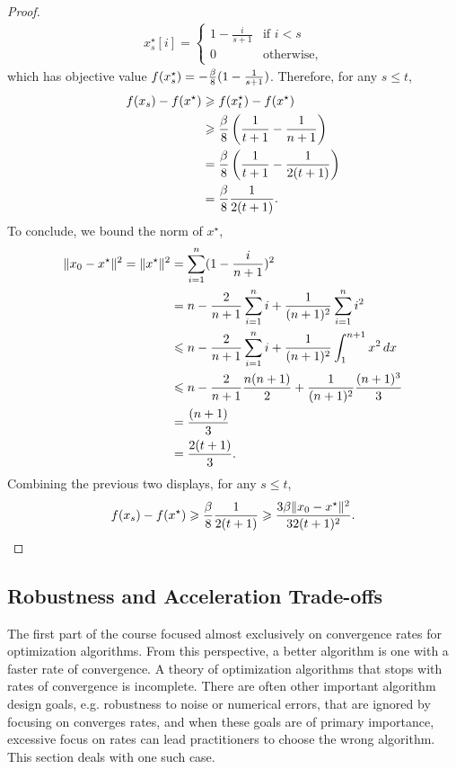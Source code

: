 \begin{proof}
\begin{align*}
    x_s^\star[i] = 
    \begin{cases}
        1- \frac{i}{s + 1} &\text{if } i < s \\
        0 &\text{otherwise},
    \end{cases}
\end{align*}
which has objective value $f(x_s^\star) = -\frac{\beta}{8}(1 - \frac{1}{s + 1} )$.
Therefore, for any $s \leq t$,
\begin{align*}
    f(x_s) - f(x^\star) 
    &\geqslant f(x_t^\star) - f(x^\star) \\
    &\geqslant \frac{\beta}{8} \left(\frac{1}{t+1} - \frac{1}{n+1} \right ) \\
    &= \frac{\beta}{8} \left(\frac{1}{t+1} - \frac{1}{2(t+1)} \right ) \\
    &= \frac{\beta}{8}\frac{1}{2(t+1)}.
\end{align*}
To conclude, we bound the norm of $x^\star$,
\begin{align*}
    \lVert x_0 - x^\star\rVert^2 =
    \lVert x^\star\rVert^2 
    &= \sum_{i=1}^n (1 - \frac{i}{n+1} )^2  \\
    &= n - \frac{2}{n+1} \sum_{i=1}^n i + \frac{1}{(n+1)^2} \sum_{i=1}^{n} i^2 \\
    &\leqslant n - \frac{2}{n+1} \sum_{i=1}^n i + \frac{1}{(n+1)^2} \int_1^{n+1} x^2 \, dx \\
    &\leqslant n - \frac{2}{n+1}\frac{n(n+1)}{2} + \frac{1}{(n+1)^2} \frac{(n+1)^3}{3} \\
    &= \frac{(n+1)}{3} \\
    &= \frac{2(t+1)}{3}.
\end{align*}
Combining the previous two displays, for any $s \leq t$,
\begin{align*}
    f(x_s) - f(x^\star)
    \geqslant \frac{\beta}{8}\frac{1}{2(t+1)} 
    \geqslant \frac{3 \beta\lVert x_0 - x^\star\rVert^2}{32(t+1)^2}.
\end{align*}
\end{proof}

\subsection{Robustness and Acceleration Trade-offs}
The first part of the course focused almost exclusively on
convergence rates for optimization algorithms. From this
perspective, a better algorithm is one with a faster rate of convergence.
A theory of optimization algorithms that stops with rates of
convergence is incomplete. There are often other important algorithm design
goals, e.g. robustness to noise or numerical errors, that are ignored by
focusing on converges rates, and when these goals are of primary importance, 
excessive focus on rates can lead practitioners to choose the wrong algorithm.
This section deals with one such case.

